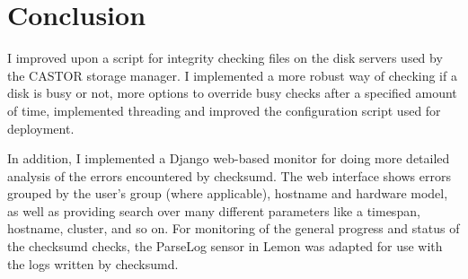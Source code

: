 \section{Conclusion}
I improved upon a script for integrity checking files on the disk servers used by the CASTOR storage manager. I implemented a more robust way of checking if a disk is busy or not, more options to override busy checks after a specified amount of time, implemented threading and improved the configuration script used for deployment.

In addition, I implemented a Django web-based monitor for doing more detailed analysis of the errors encountered by checksumd. The web interface shows errors grouped by the user's group (where applicable), hostname and hardware model, as well as providing search over many different parameters like a timespan, hostname, cluster, and so on. For monitoring of the general progress and status of the checksumd checks, the ParseLog sensor in Lemon was adapted for use with the logs written by checksumd.
